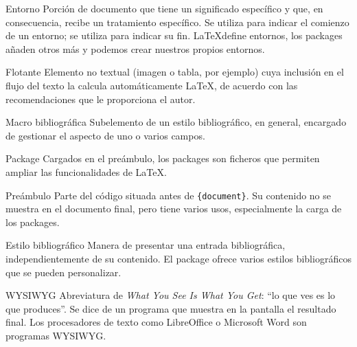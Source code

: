 \begin{glossaire}
\item[Entorno] Porción de documento que tiene un significado específico y que, en consecuencia, recibe un tratamiento específico. Se utiliza  para indicar el comienzo de un entorno; se utiliza  para indicar su fin. \LaTeX define entornos, los packages añaden otros más y podemos crear nuestros propios entornos.

\item[Flotante] Elemento no textual (imagen o tabla, por ejemplo) cuya inclusión en el flujo del texto la calcula automáticamente \LaTeX, de acuerdo con las recomendaciones que le proporciona el autor.

\item[Macro bibliográfica] Subelemento de un estilo bibliográfico, en general, encargado de gestionar el aspecto de uno o varios campos.

\item[Package] Cargados en el preámbulo, los packages son ficheros que permiten ampliar las funcionalidades de \LaTeX.

\item[Preámbulo] Parte del código  situada antes de \verb|{document}|. Su contenido no se muestra en el documento final, pero tiene varios usos, especialmente la carga de los packages.

\item[Estilo bibliográfico] Manera de presentar una entrada bibliográfica, independientemente de su contenido. El package  ofrece varios estilos bibliográficos que se pueden personalizar. 

\item[WYSIWYG] Abreviatura de \textenglish{\emph{What You See Is What You Get}}: \enquote{lo que ves es lo que produces}. Se dice de un programa que muestra en la pantalla el resultado final. Los procesadores de texto como LibreOffice o Microsoft Word son programas WYSIWYG.
\end{glossaire}

